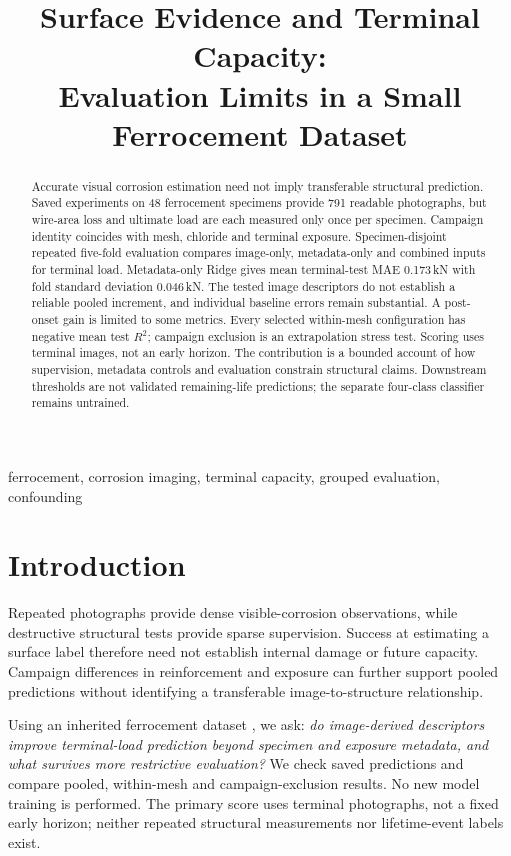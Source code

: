 \documentclass[conference]{IEEEtran}
\title{Surface Evidence and Terminal Capacity:\\Evaluation Limits in a Small Ferrocement Dataset}
\author{\IEEEauthorblockN{Parastoo Hashemi Alvar}\IEEEauthorblockA{Politecnico di Torino\\Turin, Italy}}
\begin{document}
\maketitle
\begin{abstract}
Accurate visual corrosion estimation need not imply transferable structural prediction. Saved experiments on 48 ferrocement specimens provide 791 readable photographs, but wire-area loss and ultimate load are each measured only once per specimen. Campaign identity coincides with mesh, chloride and terminal exposure. Specimen-disjoint repeated five-fold evaluation compares image-only, metadata-only and combined inputs for terminal load. Metadata-only Ridge gives mean terminal-test MAE 0.173\,kN with fold standard deviation 0.046\,kN. The tested image descriptors do not establish a reliable pooled increment, and individual baseline errors remain substantial. A post-onset gain is limited to some metrics. Every selected within-mesh configuration has negative mean test $R^2$; campaign exclusion is an extrapolation stress test. Scoring uses terminal images, not an early horizon. The contribution is a bounded account of how supervision, metadata controls and evaluation constrain structural claims. Downstream thresholds are not validated remaining-life predictions; the separate four-class classifier remains untrained.
\end{abstract}
\begin{IEEEkeywords}
ferrocement, corrosion imaging, terminal capacity, grouped evaluation, confounding
\end{IEEEkeywords}

\section{Introduction}
Repeated photographs provide dense visible-corrosion observations, while destructive structural tests provide sparse supervision. Success at estimating a surface label therefore need not establish internal damage or future capacity. Campaign differences in reinforcement and exposure can further support pooled predictions without identifying a transferable image-to-structure relationship.

Using an inherited ferrocement dataset \cite{hossain_thesis,artiste2025}, we ask: \emph{do image-derived descriptors improve terminal-load prediction beyond specimen and exposure metadata, and what survives more restrictive evaluation?} We check saved predictions and compare pooled, within-mesh and campaign-exclusion results. No new model training is performed. The primary score uses terminal photographs, not a fixed early horizon; neither repeated structural measurements nor lifetime-event labels exist.
\end{document}
